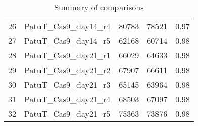 \documentclass{article}
\begin{document}
\begin{table}[ht]
\begin{tabular}{ccccc}
  26 & PatuT\_Cas9\_day14\_r4 & 80783 & 78521 & 0.97 \\ 
  27 & PatuT\_Cas9\_day14\_r5 & 62168 & 60714 & 0.98 \\ 
  28 & PatuT\_Cas9\_day21\_r1 & 66029 & 64633 & 0.98 \\ 
  29 & PatuT\_Cas9\_day21\_r2 & 67907 & 66611 & 0.98 \\ 
  30 & PatuT\_Cas9\_day21\_r3 & 65145 & 63964 & 0.98 \\ 
  31 & PatuT\_Cas9\_day21\_r4 & 68503 & 67097 & 0.98 \\ 
  32 & PatuT\_Cas9\_day21\_r5 & 75363 & 73876 & 0.98 \\ 
   \hline
\end{tabular}
\caption{Summary of comparisons} 
\label{tab:one}
\end{table}
\end{document}
